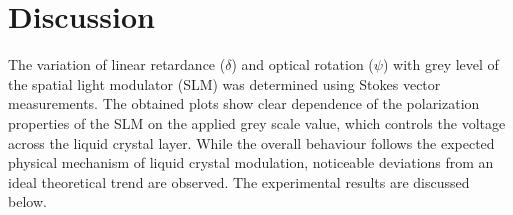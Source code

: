 \section{Discussion}

The variation of linear retardance ($\delta$) and optical rotation ($\psi$) with grey level of the spatial light modulator (SLM) was determined using Stokes vector measurements. The obtained plots show clear dependence of the polarization properties of the SLM on the applied grey scale value, which controls the voltage across the liquid crystal layer. While the overall behaviour follows the expected physical mechanism of liquid crystal modulation, noticeable deviations from an ideal theoretical trend are observed. The experimental results are
discussed below.

